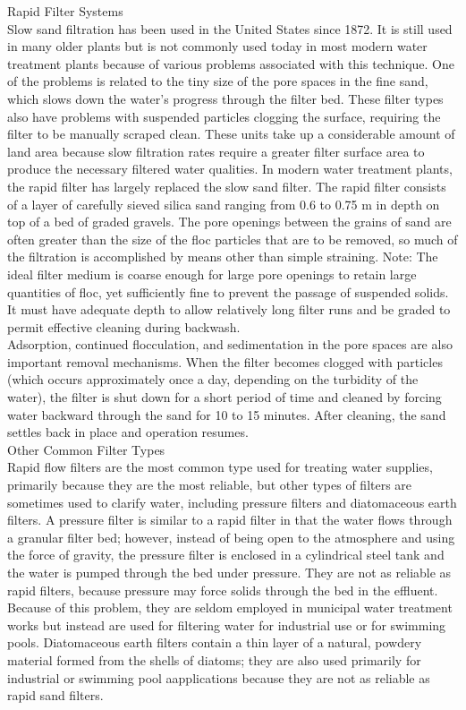 \documentclass{article}
\begin{document}
Rapid Filter Systems\\
Slow sand filtration has been used in the United States since 1872. It is still used in many older plants but is not commonly used today in most modern water treatment plants because of various problems associated with this technique. One of the problems is related to the tiny size of the pore spaces in the fine sand, which slows down the water’s progress through the filter bed. These filter types also have problems with suspended particles clogging the surface, requiring the filter to be manually scraped clean. These units take up a considerable amount of land area because slow filtration rates require a greater filter surface area to produce the necessary filtered water qualities.
In modern water treatment plants, the rapid filter has largely replaced the slow sand filter. The rapid filter consists of a layer of carefully sieved silica sand ranging from 0.6 to 0.75 m in depth on top of a bed of graded gravels. The pore openings between the grains of sand are often greater than the size of the floc particles that are to be removed, so much of the filtration is accomplished by means other than simple straining.
Note: The ideal filter medium is coarse enough for large pore openings to retain large quantities of floc, yet sufficiently fine to prevent the passage of suspended solids. It must have adequate depth to allow relatively long filter runs and be graded to permit effective cleaning during backwash.\\
Adsorption, continued flocculation, and sedimentation in the pore spaces are also important removal mechanisms. When the filter becomes clogged with particles (which occurs approximately once a day, depending on the turbidity of the water), the filter is shut down for a short period of time and cleaned by forcing water backward through the sand for 10 to 15 minutes. After cleaning, the sand settles back in place and operation resumes.\\
Other Common Filter Types\\
Rapid flow filters are the most common type used for treating water supplies, primarily because they are the most reliable, but other types of filters are sometimes used to clarify water, including pressure filters and diatomaceous earth filters. A pressure filter is similar to a rapid filter in that the water flows through a granular filter bed; however, instead of being open to the atmosphere and using the force of gravity, the pressure filter is enclosed in a cylindrical steel tank and the water is pumped through the bed under pressure. They are not as reliable as rapid filters, because pressure may force solids through the bed in the effluent. Because of this problem, they are seldom employed in municipal water treatment works but instead are used for filtering water for industrial use or for swimming pools. Diatomaceous earth filters contain a thin layer of a natural, powdery material formed from the shells of diatoms; they are also used primarily for industrial or swimming pool aapplications because they are not as reliable as rapid sand filters.\\
\end{document}
